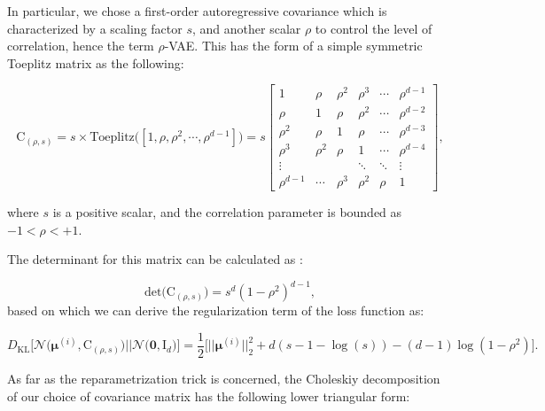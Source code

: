 \documentclass{article}
\begin{document}
In particular, we chose a first-order autoregressive covariance which is characterized by a scaling factor $s$, and another scalar $\rho$ to control the level of correlation, hence the term $\rho$-VAE. This has the form of a simple symmetric Toeplitz matrix as the following:

\begin{equation}  \label{eq:rho_cov}
\mathrm{C}_{(\rho,s)} = s \times  \text{Toeplitz} \Big([1,\rho, \rho^2, \cdots, \rho^{d-1}] \Big)
= s \begin{bmatrix}
    1          & \rho        & \rho^2     & \rho^3       & \cdots   & \rho^{d-1} \\
    \rho       & 1           & \rho       & \rho^2       & \cdots   & \rho^{d-2} \\
    \rho^2     & \rho        & 1          & \rho         & \cdots   & \rho^{d-3} \\
    \rho^3     & \rho^2      & \rho       & 1            & \cdots   & \rho^{d-4} \\
    \vdots     &       &       & \ddots       & \ddots   & \vdots      \\
    \rho^{d-1} & \cdots  & \rho^3 & \rho^2   & \rho   & 1
  \end{bmatrix},
\end{equation}

where $s$ is a positive scalar, and the correlation parameter is bounded as $-1 < \rho  < +1$.

The determinant for this matrix can be calculated as \cite{10.2307/1993228}: 

\begin{equation} \label{eq:rho_det}
\text{det} \big( \mathrm{C}_{(\rho,s)} \big) = s^d (1 - \rho^2)^{d-1},
\end{equation}
based on which we can derive the regularization term of the loss function as:

\begin{equation} \label{eq:rho_KLD_loss}
D_{\text{KL}}\Big[ \mathcal{N} \Big( \boldsymbol{\mu}^{(i)}, \mathrm{C}_{(\rho,s)} \Big)    \Big|\Big|  \mathcal{N} \big( \mathbf{0}, \mathrm{I}_d \big)  \Big] = \frac{1}{2} \Big[
\big|\big| \boldsymbol{\mu}^{(i)} \big|\big|_2^2 + d(s-1-\log{(s)})  - (d-1)\log{(1 - \rho^2)}  
\Big].
\end{equation}


As far as the reparametrization trick is concerned, the Choleskiy decomposition of our choice of covariance matrix has the following lower triangular form:
\end{document}
